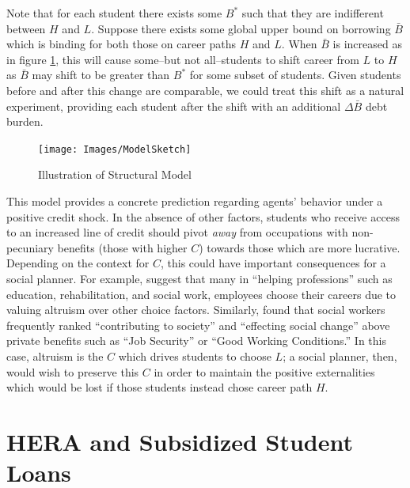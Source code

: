 \documentclass[12pt]{article}
\begin{document}
	Note that for each student there exists some $B^*$ such that they are indifferent between $H$ and $L$. Suppose there exists some global upper bound on borrowing $\bar{B}$ which is binding for both those on career paths $H$ and $L$. When $\bar{B}$ is increased as in figure \ref{struc}, this will cause some--but not all--students to shift career from $L$ to $H$ as $\bar{B}$ may shift to be greater than $B^*$ for some subset of students. Given students before and after this change are comparable, we could treat this shift as a natural experiment, providing each student after the shift with an additional $\Delta\bar{B}$ debt burden. 
	
		
	\begin{figure}
		\centering
		\caption{Illustration of Structural Model}
		\label{struc}
		\texttt{[image: Images/ModelSketch]}
	\end{figure}

	This model provides a concrete prediction regarding agents' behavior under a positive credit shock. In the absence of other factors, students who receive access to an increased line of credit should pivot \emph{away} from occupations with non-pecuniary benefits (those with higher $C$) towards those which are more lucrative. Depending on the context for $C$, this could have important consequences for a social planner. For example, \textcite{benshem1991} suggest that many in ``helping professions'' such as education, rehabilitation, and social work, employees choose their careers due to valuing altruism over other choice factors. Similarly, \textcite{hanson1995} found that social workers frequently ranked ``contributing to society'' and ``effecting social change'' above private benefits such as ``Job Security'' or ``Good Working Conditions.'' In this case, altruism is the $C$ which drives students to choose $L$; a social planner, then, would wish to preserve this $C$ in order to maintain the positive externalities which would be lost if those students instead chose career path $H$.

	\section{HERA and Subsidized Student Loans}
	
\end{document}
